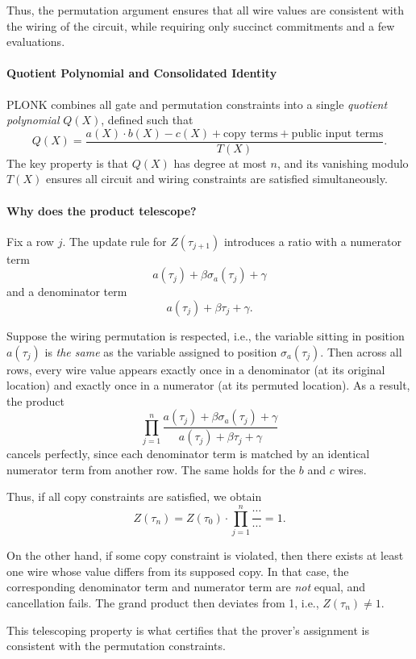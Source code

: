 \medskip
Thus, the permutation argument ensures that all wire values are consistent with the wiring of the circuit, while requiring only succinct commitments and a few evaluations.


\paragraph{Quotient Polynomial and Consolidated Identity}  
PLONK combines all gate and permutation constraints into a single \emph{quotient polynomial} \(Q(X)\), defined such that
\[
Q(X) = \frac{a(X) \cdot b(X) - c(X) + \text{copy terms} + \text{public input terms}}{T(X)}.
\]  
The key property is that \(Q(X)\) has degree at most \(n\), and its vanishing modulo \(T(X)\) ensures all circuit and wiring constraints are satisfied simultaneously.

\medskip
\paragraph{Why does the product telescope?}  
Fix a row \(j\).  
The update rule for \(Z(\tau_{j+1})\) introduces a ratio with a numerator term
\[
a(\tau_j) + \beta \sigma_a(\tau_j) + \gamma
\]
and a denominator term
\[
a(\tau_j) + \beta \tau_j + \gamma.
\]

Suppose the wiring permutation is respected, i.e., the variable sitting in position \(a(\tau_j)\) is \emph{the same} as the variable assigned to position \(\sigma_a(\tau_j)\).  
Then across all rows, every wire value appears exactly once in a denominator (at its original location) and exactly once in a numerator (at its permuted location).  
As a result, the product
\[
\prod_{j=1}^n \frac{a(\tau_j) + \beta \sigma_a(\tau_j) + \gamma}{a(\tau_j) + \beta \tau_j + \gamma}
\]
cancels perfectly, since each denominator term is matched by an identical numerator term from another row.  
The same holds for the \(b\) and \(c\) wires.  

Thus, if all copy constraints are satisfied, we obtain
\[
Z(\tau_n) = Z(\tau_0) \cdot \prod_{j=1}^n \frac{\cdots}{\cdots} = 1.
\]

\medskip
On the other hand, if some copy constraint is violated, then there exists at least one wire whose value differs from its supposed copy.  
In that case, the corresponding denominator term and numerator term are \emph{not} equal, and cancellation fails.  
The grand product then deviates from 1, i.e., \(Z(\tau_n) \neq 1\).  

\medskip
This telescoping property is what certifies that the prover’s assignment is consistent with the permutation constraints.


